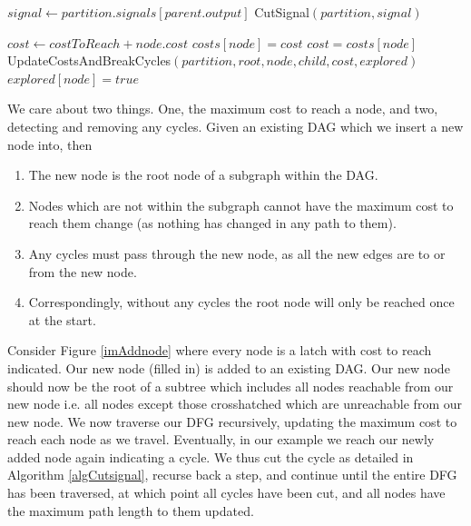 \documentclass[12pt,final,oneside]{dwThesis} %
\begin{document}
\begin{algorithm}
      \begin{algorithmic}[1]
            
        \Return \EndIf {} 

         \State $signal \gets partition.signals[parent.output]$  
         \State CutSignal$(partition, signal)$

        \Return
        \EndIf 
         \State $cost \gets costToReach+node.cost$
         \State $costs[node] = cost$ \Else 
         \State
         $cost = costs[node]$ \EndIf {} 
         \State
         UpdateCostsAndBreakCycles$(partition, root, node, child, cost,
         explored)$ \EndFor 
         \State $explored[node] = true$ \EndProcedure

      \end{algorithmic}

   \end{algorithm}
   We care about two things. One, the
   maximum cost to reach a node, and two, detecting and removing any cycles.
   Given an existing \gls{DAG} which we insert a new node into, then

   \begin{enumerate}

      \item The new node is the root node of a subgraph within the \gls{DAG}.
      \item Nodes which are not within the subgraph cannot have the maximum
         cost to reach them change (as nothing has changed in any path to
         them).
      \item Any cycles must pass through the new node, as all the new edges are
         to or from the new node.
      \item Correspondingly, without any cycles the root node will only be
         reached once at the start.  
   \end{enumerate}
   Consider Figure
   \ref{imAddnode} where every node is a latch with cost to reach indicated.
   Our new node (filled in) is added to an existing \gls{DAG}. Our new node
   should now be the root of a subtree which includes all nodes reachable
   from our new node i.e. all nodes except those crosshatched which are
   unreachable from our new node.  We now traverse our \gls{DFG}
   recursively, updating the maximum cost to reach each node as we travel.
   Eventually, in our example we reach our newly added node again indicating
   a cycle. We thus cut the cycle as detailed in Algorithm
   \ref{algCutsignal}, recurse back a step,
   and continue until the entire \gls{DFG} has been traversed, at which
   point all cycles have been cut, and all nodes have the maximum path
   length to them updated.
   
\end{document}
